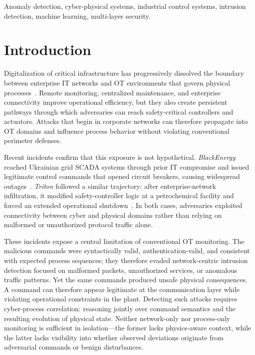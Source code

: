 \documentclass[journal,twoside,web]{ieeecolor}
\begin{document}
\begin{IEEEkeywords}
Anomaly detection, cyber-physical systems, industrial control systems, intrusion detection, machine learning, multi-layer security.
\end{IEEEkeywords}

\IEEEpeerreviewmaketitle

\section{Introduction} \label{sec:intro}

Digitalization of critical infrastructure has progressively dissolved the boundary between enterprise IT networks and OT environments that govern physical processes~\cite{murray2017convergence}. Remote monitoring, centralized maintenance, and enterprise connectivity improve operational efficiency, but they also create persistent pathways through which adversaries can reach safety-critical controllers and actuators. Attacks that begin in corporate networks can therefore propagate into OT domains and influence process behavior without violating conventional perimeter defenses.

Recent incidents confirm that this exposure is not hypothetical. \textit{BlackEnergy} reached Ukrainian grid SCADA systems through prior IT compromise and issued legitimate control commands that opened circuit breakers, causing widespread outages~\cite{sans2016analysis}. \textit{Triton} followed a similar trajectory: after enterprise-network infiltration, it modified safety-controller logic at a petrochemical facility and forced an extended operational shutdown~\cite{johnson2017attackers}. In both cases, adversaries exploited connectivity between cyber and physical domains rather than relying on malformed or unauthorized protocol traffic alone.

These incidents expose a central limitation of conventional OT monitoring. The malicious commands were syntactically valid, authentication-valid, and consistent with expected process sequences; they therefore evaded network-centric intrusion detection focused on malformed packets, unauthorized services, or anomalous traffic patterns. Yet the same commands produced unsafe physical consequences. A command can therefore appear legitimate at the communication layer while violating operational constraints in the plant. Detecting such attacks requires cyber-process correlation: reasoning jointly over command semantics and the resulting evolution of physical state. Neither network-only nor process-only monitoring is sufficient in isolation---the former lacks physics-aware context, while the latter lacks visibility into whether observed deviations originate from adversarial commands or benign disturbances.
\end{document}
